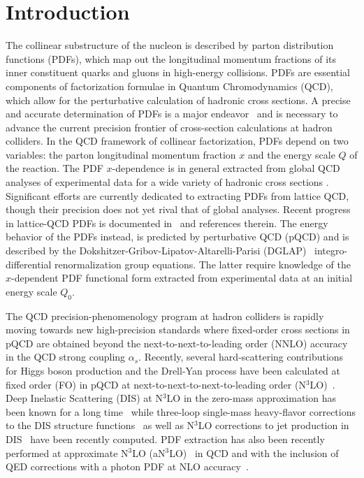 \documentclass[12pt,notitlepage,aps,preprintnumbers,superscriptaddress,nofootinbib,aps,prd,floatfix]{revtex4-2}
\begin{document}
\section{Introduction}
The collinear substructure of the nucleon is described by parton distribution functions (PDFs), which map out the longitudinal momentum fractions of its inner constituent quarks and gluons in high-energy collisions. PDFs are essential components of factorization formulae in Quantum Chromodynamics (QCD), which allow for the perturbative calculation of hadronic cross sections. A precise and accurate determination of PDFs is a major endeavor~\cite{Hou:2019efy,Bailey:2020ooq,NNPDF:2021njg} and is necessary to advance the current precision frontier of cross-section calculations at hadron colliders. In the QCD framework of collinear factorization, PDFs depend on two variables: the parton longitudinal momentum fraction $x$ and the energy scale $Q$ of the reaction. 
The PDF $x$-dependence is in general extracted from global QCD analyses of experimental data for a wide variety of hadronic cross sections \cite{Hou:2019efy,Bailey:2020ooq,NNPDF:2021njg,NNPDF:2024nan,McGowan:2022nag,Ablat:2024muy}. Significant efforts are currently dedicated to extracting PDFs from lattice QCD, though their precision does not yet rival that of global analyses. Recent progress in lattice-QCD PDFs is documented in~\cite{Lin:2025hka,Constantinou:2020hdm,Lin:2017snn,Cichy:2019ebf,Ma:2017pxb,Radyushkin:2017cyf} and references therein. 
%
The energy behavior of the PDFs instead, is predicted by perturbative QCD (pQCD) and is described by the Dokshitzer-Gribov-Lipatov-Altarelli-Parisi (DGLAP)~\cite{Gribov:1972rt,Gribov:1972ri,Lipatov:1974qm,Dokshitzer:1977sg,Altarelli:1977zs} integro-differential renormalization group equations. The latter require knowledge of the $x$-dependent PDF functional form extracted from experimental data at an initial energy scale $Q_0$.

The QCD precision-phenomenology program at hadron colliders is rapidly moving towards new high-precision standards where fixed-order cross sections in pQCD are obtained beyond the next-to-next-to-leading order (NNLO) accuracy in the QCD strong coupling $\alpha_s$. Recently, several hard-scattering contributions for Higgs boson production and the Drell-Yan process have been calculated at fixed order (FO) in pQCD at next-to-next-to-next-to-leading order (N$^3$LO)~\cite{Anastasiou:2015vya,Mistlberger:2018etf,Duhr:2019kwi,Baglio:2022wzu,Dreyer:2016oyx,Chen:2019lzz,Duhr:2020sdp,Duhr:2021vwj,Dulat:2017prg,Dulat:2018bfe,Chen:2021isd,Billis:2021ecs,Camarda:2021ict,Chen:2021vtu,Chen:2022lwc,Caola:2022ayt}. Deep Inelastic Scattering (DIS) at N$^3$LO in the zero-mass approximation has been known for a long time~\cite{Vermaseren:2005qc,Moch:2004xu,Moch:2007rq,Moch:2008fj} while
three-loop single-mass heavy-flavor corrections to the DIS structure functions~\cite{Ablinger:2025awb} as well as N$^{3}$LO corrections to jet production in DIS~\cite{Gehrmann:2018odt,Currie:2018fgr} have been recently computed. PDF extraction has also been recently performed at approximate N$^3$LO (aN$^3$LO)~\cite{NNPDF:2024nan,McGowan:2022nag} in QCD and with the inclusion of QED corrections with a photon PDF at NLO accuracy~\cite{Cridge:2023ryv,Ball:2025xgq}. 
\end{document}
